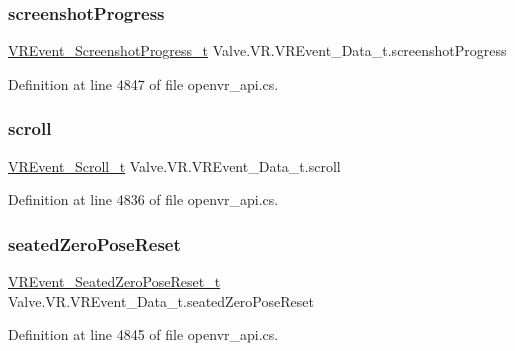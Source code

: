 \subsubsection{\texorpdfstring{screenshotProgress}{screenshotProgress}}
{\footnotesize\ttfamily \mbox{\hyperlink{struct_valve_1_1_v_r_1_1_v_r_event___screenshot_progress__t}{V\+R\+Event\+\_\+\+Screenshot\+Progress\+\_\+t}} Valve.\+V\+R.\+V\+R\+Event\+\_\+\+Data\+\_\+t.\+screenshot\+Progress}



Definition at line 4847 of file openvr\+\_\+api.\+cs.

\mbox{\label{struct_valve_1_1_v_r_1_1_v_r_event___data__t_a8656c16f4bad1786b529fb38b12383af}} 
\subsubsection{\texorpdfstring{scroll}{scroll}}
{\footnotesize\ttfamily \mbox{\hyperlink{struct_valve_1_1_v_r_1_1_v_r_event___scroll__t}{V\+R\+Event\+\_\+\+Scroll\+\_\+t}} Valve.\+V\+R.\+V\+R\+Event\+\_\+\+Data\+\_\+t.\+scroll}



Definition at line 4836 of file openvr\+\_\+api.\+cs.

\mbox{\label{struct_valve_1_1_v_r_1_1_v_r_event___data__t_a945a26b3f79bbe6afc6d23d43e77adc0}} 
\subsubsection{\texorpdfstring{seatedZeroPoseReset}{seatedZeroPoseReset}}
{\footnotesize\ttfamily \mbox{\hyperlink{struct_valve_1_1_v_r_1_1_v_r_event___seated_zero_pose_reset__t}{V\+R\+Event\+\_\+\+Seated\+Zero\+Pose\+Reset\+\_\+t}} Valve.\+V\+R.\+V\+R\+Event\+\_\+\+Data\+\_\+t.\+seated\+Zero\+Pose\+Reset}



Definition at line 4845 of file openvr\+\_\+api.\+cs.

\mbox{\label{struct_valve_1_1_v_r_1_1_v_r_event___data__t_a77ca0e431b02fe5bca854593e34fc5fc}} 
